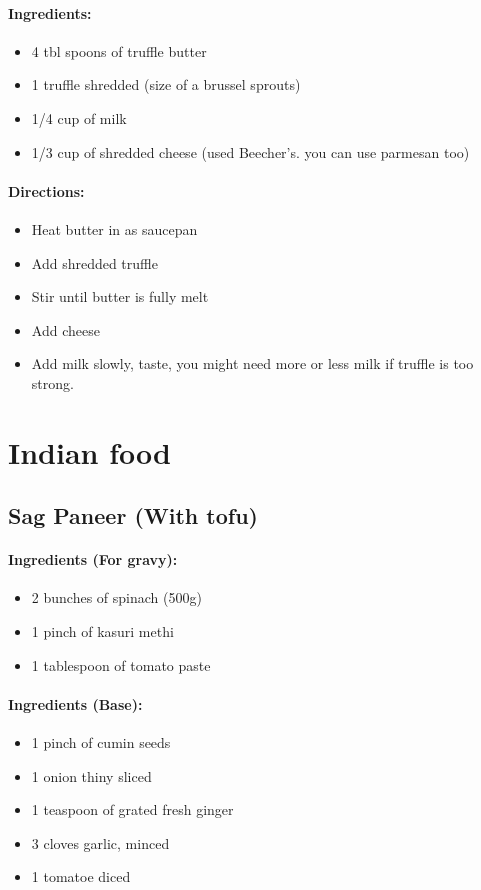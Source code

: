 \documentclass{article}
\begin{document}
\paragraph{Ingredients:}

\begin{itemize}
	\item 4 tbl spoons of truffle butter
	\item 1 truffle shredded (size of a brussel sprouts)
	\item 1/4 cup of milk
	\item 1/3 cup of shredded cheese (used Beecher's. you can use parmesan too)
\end{itemize}

\paragraph{Directions:}
\begin{itemize}
	\item Heat butter in as saucepan
	\item Add shredded truffle
	\item Stir until butter is fully melt
	\item Add cheese
	\item Add milk slowly, taste, you might need more or less milk if truffle is too strong.
\end{itemize}

\section{Indian food}

\subsection{Sag Paneer (With tofu)}

\paragraph{Ingredients (For gravy):}
\begin{itemize}
\item 2 bunches of spinach (500g)
\item 1 pinch of kasuri methi
\item 1 tablespoon of tomato paste
\end{itemize}

\paragraph{Ingredients (Base):}
\begin{itemize}
\item 1 pinch of cumin seeds
\item 1 onion thiny sliced
\item 1 teaspoon of grated fresh ginger
\item 3 cloves garlic, minced
\item 1 tomatoe diced
\end{itemize}
\end{document}

